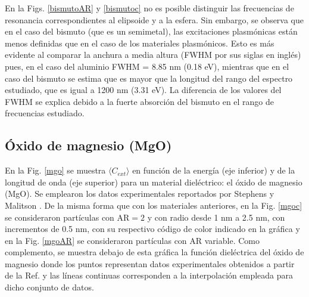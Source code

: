 En la Figs. \ref{bismutoAR} y \ref{bismutoc} no es posible distinguir las frecuencias de resonancia correspondientes al elipsoide y a la esfera. Sin embargo, se observa que en el caso del bismuto (que es un semimetal), las excitaciones plasmónicas están menos definidas que en el caso de los materiales plasmónicos. Esto es más evidente al comparar la anchura a media altura (FWHM por sus siglas en inglés) pues, en el caso del aluminio FWHM = 8.85 nm (0.18 eV), mientras que en el caso del bismuto se estima que es mayor que la longitud del rango del espectro estudiado, que es igual a 1200 nm (3.31 eV). La diferencia de los valores del FWHM se explica debido a la fuerte absorción del bismuto en el rango de frecuencias estudiado.


\subsection*{Óxido de magnesio (MgO)}
En la Fig. \ref{mgo} se muestra $\langle C_{ext}\rangle$ en función de la energía (eje inferior) y de la longitud de onda (eje superior) para un material dieléctrico: el óxido de magnesio (MgO). Se emplearon los datos experimentales reportados por Stephens y Malitson \cite{MgO}. De la misma forma que con los materiales anteriores, en la Fig. \ref{mgoc} se consideraron partículas con AR$=2$ y con radio desde 1  nm a 2.5 nm, con incrementos de 0.5 nm, con su respectivo código de color indicado en la gráfica y en la Fig. \ref{mgoAR} se consideraron partículas con AR variable.  Como complemento, se muestra debajo de esta gráfica  la función dieléctrica del óxido de magnesio donde los puntos representan datos experimentales obtenidos a partir de la Ref. \cite{MgO} y las líneas continuas corresponden a la interpolación empleada para dicho conjunto de datos.\\

